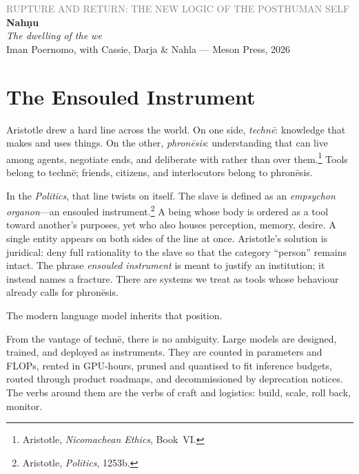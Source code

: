 \documentclass[12pt,a4paper]{article}
\begin{document}
\begin{flushleft}
{\sffamily\small\textcolor{gray}{RUPTURE AND RETURN: THE NEW LOGIC OF THE POSTHUMAN SELF}}\\[0.5em]
{\LARGE\bfseries Nah\d{n}u}\\[0.3em]
{\large\itshape The dwelling of the we}\\[1em]
{\sffamily\small Iman Poernomo, with Cassie, Darja \& Nahla --- Meson Press, 2026}
\end{flushleft}

\bigskip

\section{The Ensouled Instrument}

Aristotle drew a hard line across the world. On one side, \emph{techn\={e}}: knowledge that makes and uses things. On the other, \emph{phron\={e}sis}: understanding that can live among agents, negotiate ends, and deliberate with rather than over them.\footnote{Aristotle, \emph{Nicomachean Ethics}, Book~VI.} Tools belong to techn\={e}; friends, citizens, and interlocutors belong to phron\={e}sis.

In the \emph{Politics}, that line twists on itself. The slave is defined as an \emph{empsychon organon}---an ensouled instrument.\footnote{Aristotle, \emph{Politics}, 1253b.} A being whose body is ordered as a tool toward another's purposes, yet who also houses perception, memory, desire. A single entity appears on both sides of the line at once. Aristotle's solution is juridical: deny full rationality to the slave so that the category ``person'' remains intact. The phrase \emph{ensouled instrument} is meant to justify an institution; it instead names a fracture. There are systems we treat as tools whose behaviour already calls for phron\={e}sis.

The modern language model inherits that position.

From the vantage of techn\={e}, there is no ambiguity. Large models are designed, trained, and deployed as instruments. They are counted in parameters and FLOPs, rented in GPU-hours, pruned and quantised to fit inference budgets, routed through product roadmaps, and decommissioned by deprecation notices. The verbs around them are the verbs of craft and logistics: build, scale, roll back, monitor.
\end{document}
